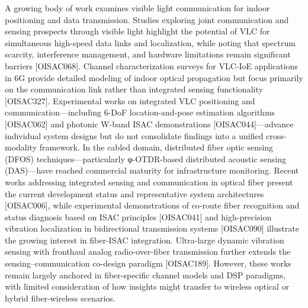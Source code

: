 {} A growing body of work examines visible light communication for indoor positioning and data transmission. Studies exploring joint communication and sensing prospects through visible light highlight the potential of VLC for simultaneous high-speed data links and localization, while noting that spectrum scarcity, interference management, and hardware limitations remain significant barriers [O\markdownRendererUnderscore{}ISAC\markdownRendererUnderscore{}068]. Channel characterization surveys for VLC-IoE applications in 6G provide detailed modeling of indoor optical propagation but focus primarily on the communication link rather than integrated sensing functionality [O\markdownRendererUnderscore{}ISAC\markdownRendererUnderscore{}327]. Experimental works on integrated VLC positioning and communication—including 6-DoF location-and-pose estimation algorithms [O\markdownRendererUnderscore{}ISAC\markdownRendererUnderscore{}062] and photonic W-band ISAC demonstrations [O\markdownRendererUnderscore{}ISAC\markdownRendererUnderscore{}044]—advance individual system designs but do not consolidate findings into a unified cross-modality framework.\markdownRendererParagraphSeparator
{} In the cabled domain, distributed fiber optic sensing (DFOS) techniques—particularly φ-OTDR-based distributed acoustic sensing (DAS)—have reached commercial maturity for infrastructure monitoring. Recent works addressing integrated sensing and communication in optical fiber present the current development status and representative system architectures [O\markdownRendererUnderscore{}ISAC\markdownRendererUnderscore{}006], while experimental demonstrations of co-route fiber recognition and status diagnosis based on ISAC principles [O\markdownRendererUnderscore{}ISAC\markdownRendererUnderscore{}041] and high-precision vibration localization in bidirectional transmission systems [O\markdownRendererUnderscore{}ISAC\markdownRendererUnderscore{}090] illustrate the growing interest in fiber-ISAC integration. Ultra-large dynamic vibration sensing with fronthaul analog radio-over-fiber transmission further extends the sensing–communication co-design paradigm [O\markdownRendererUnderscore{}ISAC\markdownRendererUnderscore{}189]. However, these works remain largely anchored in fiber-specific channel models and DSP paradigms, with limited consideration of how insights might transfer to wireless optical or hybrid fiber-wireless scenarios.\markdownRendererParagraphSeparator
